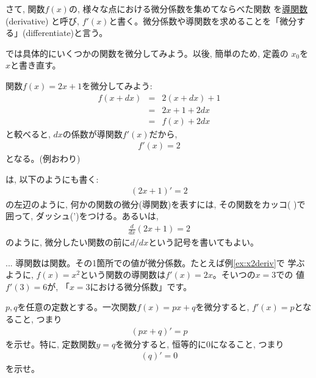 さて, 関数$f(x)$の, 様々な点における微分係数を集めてならべた関数
を\underline{導関数} (derivative)
と呼び, $f'(x)$と書く。微分係数や導関数を求めることを「微分する」(differentiate)と言う。

では具体的にいくつかの関数を微分してみよう。以後, 簡単のため, 定義の
$x_0$を$x$と書き直す。\mv

\begin{exmpl} 関数$f(x)=2x+1$を微分してみよう:
\begin{eqnarray*}
f(x+dx)&=&2(x+dx)+1\\
&=&2x+1+2dx\\
&=&f(x)+2dx
\end{eqnarray*}
と較べると, $dx$の係数が導関数$f'(x)$だから, 
\begin{eqnarray}f'(x)=2\label{eq:diff_2x_1}\end{eqnarray}
となる。(例おわり)\end{exmpl}

は, 以下のようにも書く:
\begin{eqnarray}(2x+1)'=2\label{eq:diff_2x_12}\end{eqnarray}
の左辺のように, 何かの関数の微分(導関数)を表すには, 
その関数をカッコ( )で囲って, ダッシュ(')をつける。あるいは, 
\begin{eqnarray}\frac{d}{dx}(2x+1)=2\label{eq:diff_2x_13}\end{eqnarray}
のように, 微分したい関数の前に$d/dx$という記号を書いてもよい。

\begin{faq}{\small{}
... 導関数は関数。その1箇所での値が微分係数。たとえば例\ref{ex:x2deriv}で
学ぶように, $f(x)=x^2$という関数の導関数は$f'(x)=2x$。そいつの$x=3$での
値$f'(3)=6$が, 「$x=3$における微分係数」です。}\end{faq}

\begin{q}\label{q:diff_const} $p, q$を任意の定数とする。一次関数$f(x)=px+q$を微分すると, $f'(x)=p$となること, つまり
\begin{eqnarray}(px+q)'=p\label{eq:diff_px+q}\end{eqnarray}
を示せ。特に, 定数関数$y=q$を微分すると, 恒等的に0になること, つまり
\begin{eqnarray}(q)'=0\label{eq:diff_q}\end{eqnarray}
を示せ。\end{q}
\mv


